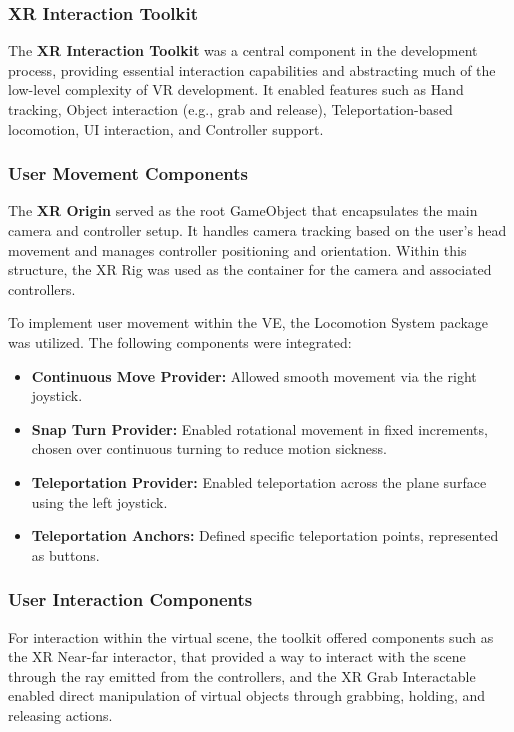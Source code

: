 \subsubsection{XR Interaction Toolkit}
The \textbf{XR Interaction Toolkit} was a central component in the development process, providing essential interaction capabilities and abstracting much of the low-level complexity of \gls{VR} development. It enabled features such as Hand tracking, 
Object interaction (e.g., grab and release), Teleportation-based locomotion, \gls{UI} interaction, and Controller support.

\subsubsection{User Movement Components}
The \textbf{XR Origin} served as the root GameObject that encapsulates the main camera and controller setup. 
It handles camera tracking based on the user's head movement and manages controller positioning and orientation. 
Within this structure, the XR Rig was used as the container for the camera and associated controllers.

To implement user movement within the \gls{VE}, the Locomotion System package was utilized. The following components were integrated: 

\begin{itemize}
\item{\textbf{Continuous Move Provider:}  Allowed smooth movement via the right joystick.}
\item{\textbf{Snap Turn Provider:}  Enabled rotational movement in fixed increments, chosen over continuous turning to reduce motion sickness.}
\item{\textbf{Teleportation Provider:} Enabled teleportation across the plane surface using the left joystick.}
\item{\textbf{Teleportation Anchors:} Defined specific teleportation points, represented as buttons.}
\end{itemize}

\subsubsection{User Interaction Components}
For interaction within the virtual scene, the toolkit offered components such as the XR Near-far interactor, that provided a way to interact with the scene through the ray emitted from the controllers, and the XR Grab Interactable enabled direct manipulation of virtual objects through grabbing, holding, and releasing actions.

